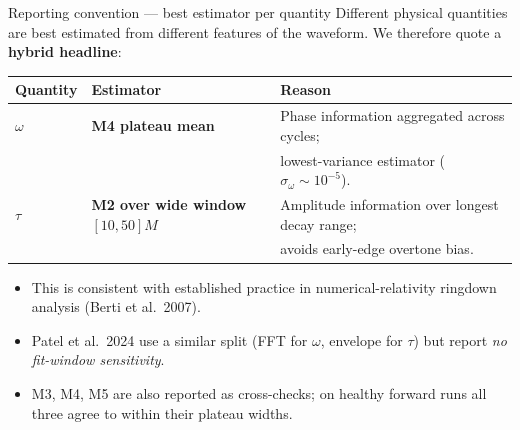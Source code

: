 \documentclass[aspectratio=169, 11pt]{beamer}
\begin{document}
\begin{frame}{Reporting convention --- best estimator per quantity}
  Different physical quantities are best estimated from different
  features of the waveform. We therefore quote a \textbf{hybrid headline}:
  \medskip
  \begin{center}\small
    \begin{tabular}{@{}lll@{}}
      \toprule
      \textbf{Quantity} & \textbf{Estimator} & \textbf{Reason} \\
      \midrule
      $\omega$ &
        \textbf{M4 plateau mean} &
        Phase information aggregated across cycles;\\
        & & lowest-variance estimator
        ($\sigma_{\omega}\!\sim\!10^{-5}$). \\
      \addlinespace
      $\tau$ &
        \textbf{M2 over wide window} $[10,50]M$ &
        Amplitude information over longest decay range; \\
        & & avoids early-edge overtone bias. \\
      \bottomrule
    \end{tabular}
  \end{center}
  \medskip
  \begin{itemize}\small
    \item This is consistent with established practice in numerical-relativity
          ringdown analysis (Berti et al.\ 2007).
    \item Patel et al.\ 2024 use a similar split (FFT for $\omega$,
          envelope for $\tau$) but report \emph{no fit-window sensitivity}.
    \item M3, M4, M5 are also reported as cross-checks; on healthy
          forward runs all three agree to within their plateau widths.
  \end{itemize}
\end{frame}
\end{document}
